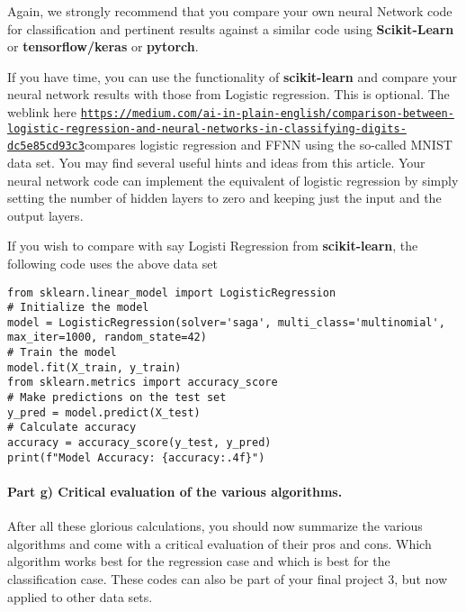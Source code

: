 \documentclass[%
oneside,                 %
final,                   %
10pt]{article}
\begin{document}
Again, we strongly recommend that you compare your own neural Network
code for classification and pertinent results against a similar code using \textbf{Scikit-Learn}  or \textbf{tensorflow/keras} or \textbf{pytorch}.

If you have time, you can use the functionality of \textbf{scikit-learn} and compare your neural network results with those from Logistic regression. This is optional.
The weblink  here \href{{https://medium.com/ai-in-plain-english/comparison-between-logistic-regression-and-neural-networks-in-classifying-digits-dc5e85cd93c3}}{\nolinkurl{https://medium.com/ai-in-plain-english/comparison-between-logistic-regression-and-neural-networks-in-classifying-digits-dc5e85cd93c3}}compares logistic regression and FFNN using the so-called MNIST data set. You may find several useful hints and ideas from this article. Your neural network code can implement the equivalent of logistic regression by simply setting the number of hidden layers to zero and keeping just the input and the output layers. 

If you wish to compare with say Logisti Regression from \textbf{scikit-learn}, the following code uses the above data set












\begin{verbatim}
from sklearn.linear_model import LogisticRegression
# Initialize the model
model = LogisticRegression(solver='saga', multi_class='multinomial', max_iter=1000, random_state=42)
# Train the model
model.fit(X_train, y_train)
from sklearn.metrics import accuracy_score
# Make predictions on the test set
y_pred = model.predict(X_test)
# Calculate accuracy
accuracy = accuracy_score(y_test, y_pred)
print(f"Model Accuracy: {accuracy:.4f}")

\end{verbatim}


\paragraph{Part g) Critical evaluation of the various algorithms.}
After all these glorious calculations, you should now summarize the
various algorithms and come with a critical evaluation of their pros
and cons. Which algorithm works best for the regression case and which
is best for the classification case. These codes can also be part of
your final project 3, but now applied to other data sets.
\end{document}
